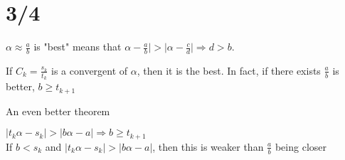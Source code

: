 \section*{3/4}
  $\alpha \approx \frac{a}{b}$ is "best" means that $\alpha - \frac{a}{b}| >
  |\alpha - \frac{c}{d}| \Rightarrow d > b$.\\
  \begin{theorem}
    If $C_k = \frac{s_k}{t_k}$ is a convergent of $\alpha$, then it is the
    best. In fact, if there exists $\frac{a}{b}$ is better, $b \ge t_{k+1}$\\
  \end{theorem}
  An even better theorem
  \begin{theorem}
    $|t_k \alpha - s_k| > |b\alpha - a| \Rightarrow b \ge t_{k +1 }$\\
    If $b < s_k$ and $|t_k\alpha - s_k| > |b\alpha - a|$, then
    this is weaker than $\frac{a}{b}$ being closer
  \end{theorem}
